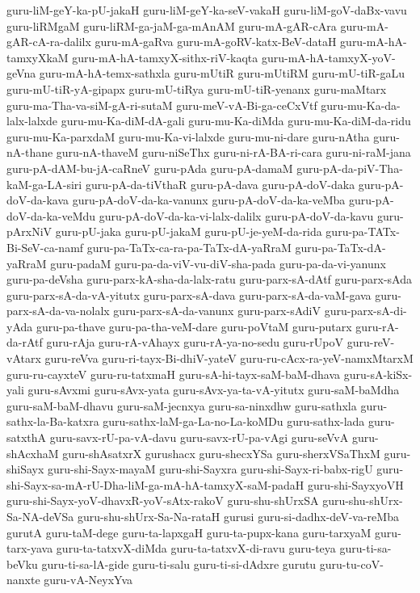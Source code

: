 {guru-liM-geY-ka-pU-jakaH
guru-liM-geY-ka-seV-vakaH
guru-liM-goV-daBx-vavu
guru-liRMgaM
guru-liRM-ga-jaM-ga-mAnAM
guru-mA-gAR-cAra
guru-mA-gAR-cA-ra-dalilx
guru-mA-gaRva
guru-mA-goRV-katx-BeV-dataH
guru-mA-hA-tamxyXkaM
guru-mA-hA-tamxyX-sithx-riV-kaqta
guru-mA-hA-tamxyX-yoV-geVna
guru-mA-hA-temx-sathxla
guru-mUtiR
guru-mUtiRM
guru-mU-tiR-gaLu
guru-mU-tiR-yA-gipapx
guru-mU-tiRya
guru-mU-tiR-yenanx
guru-maMtarx
guru-ma-Tha-va-siM-gA-ri-sutaM
guru-meV-vA-Bi-ga-ceCxVtf
guru-mu-Ka-da-lalx-lalxde
guru-mu-Ka-diM-dA-gali
guru-mu-Ka-diMda
guru-mu-Ka-diM-da-ridu
guru-mu-Ka-parxdaM
guru-mu-Ka-vi-lalxde
guru-mu-ni-dare
guru-nAtha
guru-nA-thane
guru-nA-thaveM
guru-niSeThx
guru-ni-rA-BA-ri-cara
guru-ni-raM-jana
guru-pA-dAM-bu-jA-caRneV
guru-pAda
guru-pA-damaM
guru-pA-da-piV-Tha-kaM-ga-LA-siri
guru-pA-da-tiVthaR
guru-pA-dava
guru-pA-doV-daka
guru-pA-doV-da-kava
guru-pA-doV-da-ka-vanunx
guru-pA-doV-da-ka-veMba
guru-pA-doV-da-ka-veMdu
guru-pA-doV-da-ka-vi-lalx-dalilx
guru-pA-doV-da-kavu
guru-pArxNiV
guru-pU-jaka
guru-pU-jakaM
guru-pU-je-yeM-da-rida
guru-pa-TATx-Bi-SeV-ca-namf
guru-pa-TaTx-ca-ra-pa-TaTx-dA-yaRraM
guru-pa-TaTx-dA-yaRraM
guru-padaM
guru-pa-da-viV-vu-diV-sha-pada
guru-pa-da-vi-yanunx
guru-pa-deVsha
guru-parx-kA-sha-da-lalx-ratu
guru-parx-sA-dAtf
guru-parx-sAda
guru-parx-sA-da-vA-yitutx
guru-parx-sA-dava
guru-parx-sA-da-vaM-gava
guru-parx-sA-da-va-nolalx
guru-parx-sA-da-vanunx
guru-parx-sAdiV
guru-parx-sA-di-yAda
guru-pa-thave
guru-pa-tha-veM-dare
guru-poVtaM
guru-putarx
guru-rA-da-rAtf
guru-rAja
guru-rA-vAhayx
guru-rA-ya-no-sedu
guru-rUpoV
guru-reV-vAtarx
guru-reVva
guru-ri-tayx-Bi-dhiV-yateV
guru-ru-cAcx-ra-yeV-namxMtarxM
guru-ru-cayxteV
guru-ru-tatxmaH
guru-sA-hi-tayx-saM-baM-dhava
guru-sA-kiSx-yali
guru-sAvxmi
guru-sAvx-yata
guru-sAvx-ya-ta-vA-yitutx
guru-saM-baMdha
guru-saM-baM-dhavu
guru-saM-jecnxya
guru-sa-ninxdhw
guru-sathxla
guru-sathx-la-Ba-katxra
guru-sathx-laM-ga-La-no-La-koMDu
guru-sathx-lada
guru-satxthA
guru-savx-rU-pa-vA-davu
guru-savx-rU-pa-vAgi
guru-seVvA
guru-shAcxhaM
guru-shAsatxrX
gurushacx
guru-shecxYSa
guru-sherxVSaThxM
guru-shiSayx
guru-shi-Sayx-mayaM
guru-shi-Sayxra
guru-shi-Sayx-ri-babx-rigU
guru-shi-Sayx-sa-mA-rU-Dha-liM-ga-mA-hA-tamxyX-saM-padaH
guru-shi-SayxyoVH
guru-shi-Sayx-yoV-dhavxR-yoV-sAtx-rakoV
guru-shu-shUrxSA
guru-shu-shUrx-Sa-NA-deVSa
guru-shu-shUrx-Sa-Na-rataH
gurusi
guru-si-dadhx-deV-va-reMba
gurutA
guru-taM-dege
guru-ta-lapxgaH
guru-ta-pupx-kana
guru-tarxyaM
guru-tarx-yava
guru-ta-tatxvX-diMda
guru-ta-tatxvX-di-ravu
guru-teya
guru-ti-sa-beVku
guru-ti-sa-lA-gide
guru-ti-salu
guru-ti-si-dAdxre
gurutu
guru-tu-coV-nanxte
guru-vA-NeyxYva
}
